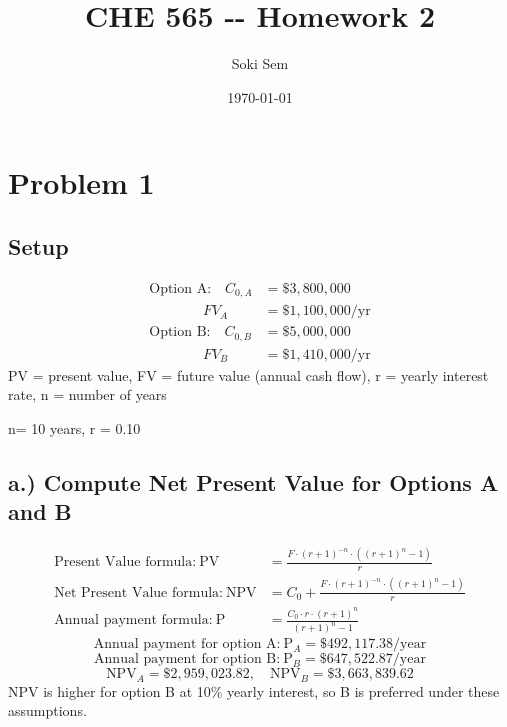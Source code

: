 \documentclass{article}%
\title{CHE 565 {-}{-} Homework 2}%
\author{Soki Sem}%
\date{\today}%
\begin{document}
%
\normalsize%
\setlength{\parindent}{0pt}%
\setlength{\parskip}{0.6em}%
\maketitle%
\section*{Problem 1}%
\label{sec:Problem1}%
\subsection*{Setup}%
\label{subsec:Setup}%
\begin{align*}%
\text{Option A:}\quad C_{0,A} &= \$3{,}800{,}000 \\%
\quad\quad\quad\;\;\; FV_A &= \$1{,}100{,}000/\text{yr} \\%
\text{Option B:}\quad C_{0,B} &= \$5{,}000{,}000 \\%
\quad\quad\quad\;\;\; FV_B &= \$1{,}410{,}000/\text{yr}%
\end{align*}%
PV = present value, FV = future value (annual cash flow), r = yearly interest rate, n = number of years%
\par%
n= 10 years, r = 0.10%
\par

%
\subsection*{a.) Compute Net Present Value for Options A and B}%
\label{subsec:a.)ComputeNetPresentValueforOptionsAandB}%
\begin{align*}%
\text{Present Value formula:}\ \text{PV} &= \frac{F \cdot \left(r + 1\right)^{- n} \cdot \left(\left(r + 1\right)^{n} - 1\right)}{r} \\%
\text{Net Present Value formula:}\ \text{NPV} &= C_{0} + \frac{F \cdot \left(r + 1\right)^{- n} \cdot \left(\left(r + 1\right)^{n} - 1\right)}{r} \\%
\text{Annual payment formula:}\ \text{P} &= \frac{C_{0} \cdot r \cdot \left(r + 1\right)^{n}}{\left(r + 1\right)^{n} - 1}%
\end{align*}%
\[%
\text{Annual payment for option A:}\ \text{P}_A = \$492,117.38/\text{year}%
\]%
\[%
\text{Annual payment for option B:}\ \text{P}_B = \$647,522.87/\text{year}%
\]%
\[%
\text{NPV}_A = \$2,959,023.82,\quad \text{NPV}_B = \$3,663,839.62%
\]%
NPV is higher for option B at 10\% yearly interest, so B is preferred under these assumptions.%
\par
\end{document}
